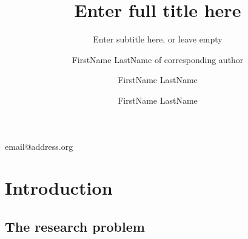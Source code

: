 \documentclass[british]{emisa}
\begin{document}
\begin{article}{%
  \title[Insert shorttitle for page headline]{Enter full title here}
  \subtitle{Enter subtitle here, or leave empty}
  \author*{FirstName LastName of corresponding author}{email@address.org}
  \address{Enter affiliation of first (corresponding) author here.  Note that only the starred version of author* accepts a second argument requiring an email address for the corresponding author.}
  \author{FirstName LastName}
  \address{Enter affiliation of second and further authors here. Add further authors following this scheme.}
  \author{FirstName LastName}
  \address[Letter of already used address]{}
  
  }
\section{Introduction}
\subsection{The research problem}
\printbibliography
\end{article}
\end{document}
